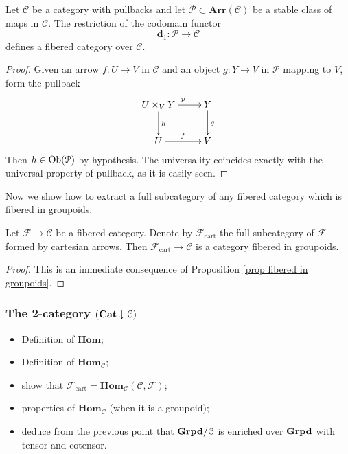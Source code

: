 \begin{refsection}
\begin{prop} \label{prop stable arrows}
Let $\mathcal C$ be a category with pullbacks and let $\mathcal P \subset \mathbf{Arr}(\mathcal C)$ be a stable class of maps in $\mathcal C$. The restriction of the codomain functor
\[
\mathbf d_1 \colon \mathcal P \to \mathcal C
\]
defines a fibered category over $\mathcal C$.
\end{prop}

\begin{proof}
Given an arrow $f \colon U \to V$ in $\mathcal C$ and an object $g \colon Y \to V$ in $\mathcal P$ mapping to $V$, form the pullback
\[
\xymatrix{
U \times_V Y \ar[d]^h \ar[r]^p & Y \ar[d]^g \\ U \ar[r]^f & V
}
\]
Then $h \in \operatorname{Ob}(\mathcal P)$ by hypothesis. The universality coincides exactly with the universal property of pullback, as it is easily seen.
\end{proof}

Now we show how to extract a full subcategory of any fibered category which is fibered in groupoids.

\begin{prop} \label{prop extracting groupoids}
Let $\mathcal F \to \mathcal C$ be a fibered category. Denote by $\mathcal F_{\mathrm{cart}}$ the full subcategory of $\mathcal F$ formed by cartesian arrows. Then $\mathcal F_{\mathrm{cart}} \to \mathcal C$ is a category fibered in groupoids.
\end{prop}

\begin{proof}
This is an immediate consequence of Proposition \ref{prop fibered in groupoids}.
\end{proof}

\subsubsection{The 2-category $(\mathbf{Cat} \downarrow \mathcal C)$}

\begin{itemize}
\item Definition of $\mathbf{Hom}$;
\item Definition of $\mathbf{Hom}_{\mathcal C}$;
\item show that $\mathcal F_{\mathrm{cart}} = \mathbf{Hom}_{\mathcal C}( \mathcal C, \mathcal F)$;
\item properties of $\mathbf{Hom}_{\mathcal C}$ (when it is a groupoid);
\item deduce from the previous point that $\mathbf{Grpd} / \mathcal C$ is enriched over $\mathbf{Grpd}$ with tensor and cotensor.
\end{itemize}


\end{refsection}
